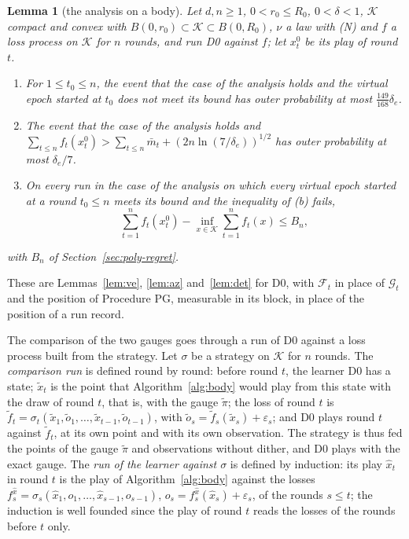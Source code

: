\documentclass[11pt]{amsart}
\newtheorem{lemma}[theorem]{Lemma}
\theoremstyle{definition}
\numberwithin{equation}{section}
\newcommand{\cK}{\mathcal{K}}
\newcommand{\cG}{\mathscr{G}}
\newcommand{\cF}{\mathscr{F}}
\begin{document}
\begin{lemma}[the analysis on a body]\label{lem:bodyan}
Let $d,n\ge1$, $0<r_0\le R_0$, $0<\delta<1$, $\cK$ compact and convex with $B(0,r_0)\subset\cK\subset B(0,R_0)$, $\nu$ a law with (N) and $f$ a loss process on $\cK$ for $n$ rounds, and run D0 against $f$; let $x^0_t$ be its play of round $t$.
\begin{enumerate}[label=(\alph*)]
\item For $1\le t_0\le n$, the event that the case of the analysis holds and the virtual epoch started at $t_0$ does not meet its bound has outer probability at most $\frac{149}{168}\delta_e$.
\item The event that the case of the analysis holds and $\sum_{t\le n}f_t(x^0_t)>\sum_{t\le n}\bar m_t+(2n\ln(7/\delta_e))^{1/2}$ has outer probability at most $\delta_e/7$.
\item On every run in the case of the analysis on which every virtual epoch started at a round $t_0\le n$ meets its bound and the inequality of (b) fails,
\[
\sum_{t=1}^nf_t(x^0_t)-\inf_{x\in\cK}\sum_{t=1}^nf_t(x)\le B_n,
\]
\end{enumerate}
with $B_n$ of Section~\ref{sec:poly-regret}.
\end{lemma}

These are Lemmas~\ref{lem:ve}, \ref{lem:az} and~\ref{lem:det} for D0, with $\cF_t$ in place of $\cG_t$ and the position of Procedure PG, measurable in its block, in place of the position of a run record.

The comparison of the two gauges goes through a run of D0 against a loss process built from the strategy. Let $\sigma$ be a strategy on $\cK$ for $n$ rounds. The \emph{comparison run} is defined round by round: before round $t$, the learner D0 has a state; $\tilde x_t$ is the point that Algorithm~\ref{alg:body} would play from this state with the draw of round $t$, that is, with the gauge $\tilde\pi$; the loss of round $t$ is $\tilde f_t=\sigma_t(\tilde x_1,\tilde o_1,\dots,\tilde x_{t-1},\tilde o_{t-1})$, with $\tilde o_s=\tilde f_s(\tilde x_s)+\varepsilon_s$; and D0 plays round $t$ against $\tilde f_t$, at its own point and with its own observation. The strategy is thus fed the points of the gauge $\tilde\pi$ and observations without dither, and D0 plays with the exact gauge. The \emph{run of the learner against $\sigma$} is defined by induction: its play $\hat x_t$ in round $t$ is the play of Algorithm~\ref{alg:body} against the losses $f^{\hat x}_s=\sigma_s(\hat x_1,o_1,\dots,\hat x_{s-1},o_{s-1})$, $o_s=f^{\hat x}_s(\hat x_s)+\varepsilon_s$, of the rounds $s\le t$; the induction is well founded since the play of round $t$ reads the losses of the rounds before $t$ only.
\end{document}
